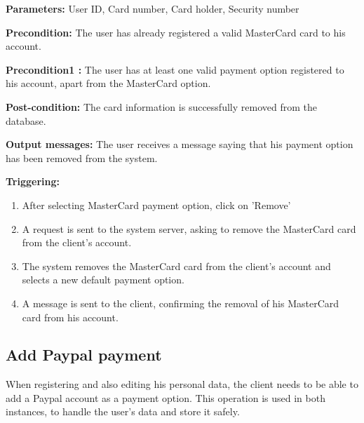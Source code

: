 \begin{description}

\item \textbf{Parameters:} User ID, Card number, Card holder, Security number

\item \textbf{Precondition:} The user has already registered a valid
MasterCard card to his account.
\item \textbf{Precondition1 :} The user has at least one valid payment option
registered to his account, apart from the MasterCard option.

\item \textbf{Post-condition:} The card information is successfully removed from
the database.

\item \textbf{Output messages:} The user receives a message saying that his
payment option has been removed from the system.

\item \textbf{Triggering:}
\begin{enumerate}
\item After selecting MasterCard payment option, click on 'Remove'

\item A request is sent to the system server, asking to remove the MasterCard card
from the client's account.

\item The system removes the MasterCard card from the client's account and selects a
new default payment option.

\item A message is sent to the client, confirming the removal of his MasterCard
card from his account.

\end{enumerate}

\end{description}

\subsection{Add Paypal payment}

 When registering and also editing his personal data, the client needs to be
 able to add a Paypal account as a payment option. This operation is used
 in both instances, to handle the user's data and store it safely.


